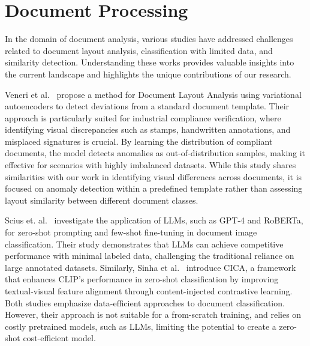\section{Document Processing}

In the domain of document analysis, various studies have addressed challenges related to document layout analysis, classification with limited data, and similarity detection. Understanding these works provides valuable insights into the current landscape and highlights the unique contributions of our research.

Veneri et al.~\cite{veneri2022document} propose a method for Document Layout Analysis using variational autoencoders to detect deviations from a standard document template. Their approach is particularly suited for industrial compliance verification, where identifying visual discrepancies such as stamps, handwritten annotations, and misplaced signatures is crucial. By learning the distribution of compliant documents, the model detects anomalies as out-of-distribution samples, making it effective for scenarios with highly imbalanced datasets. While this study shares similarities with our work in identifying visual differences across documents, it is focused on anomaly detection within a predefined template rather than assessing layout similarity between different document classes.%

Scius et. al.~\cite{scius2024zeroshot} investigate the application of \glspl{LLM}, such as GPT-4 and RoBERTa, for zero-shot prompting and few-shot fine-tuning in document image classification. Their study demonstrates that \glspl{LLM} can achieve competitive performance with minimal labeled data, challenging the traditional reliance on large annotated datasets. Similarly, Sinha et al.~\cite{sinha2024cica} introduce CICA, a framework that enhances CLIP's performance in zero-shot classification by improving textual-visual feature alignment through content-injected contrastive learning. Both studies emphasize data-efficient approaches to document classification. However, their approach is not suitable for a from-scratch training, and relies on costly pretrained models, such as LLMs, limiting the potential to create a zero-shot cost-efficient model.


